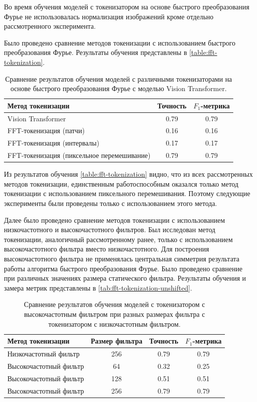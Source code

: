 Во время обучения моделей с токенизатором на основе быстрого преобразования Фурье не использовалась нормализация изображений кроме отдельно рассмотренного эксперимента.

Было проведено сравнение методов токенизации с использованием быстрого преобразования Фурье. Результаты обучения представлены в \autoref{table:fft-tokenization}.

\begin{table}[H]
  \centering
  \begin{tabular}{|l|c|c|}
    \hline
    Метод токенизации & Точность & $F_1$-метрика \\ \hline
    Vision Transformer & 0.79 & 0.79  \\
    FFT-токенизация (патчи) & 0.16 & 0.16  \\ 
    FFT-токенизация (интервалы)  & 0.17 & 0.17  \\ 
    FFT-токенизация (пиксельное перемешивание) & 0.79 & 0.79 \\
    \hline
  \end{tabular}
    \caption{Сравнение результатов обучения моделей с различными токенизаторами на основе быстрого преобразования Фурье с моделью Vision Transformer.}
  \label{table:fft-tokenization}
\end{table}

Из результатов обучения \autoref{table:fft-tokenization} видно, что из всех рассмотренных методов токенизации, единственным работоспособным оказался только метод токенизации с использованием пиксельного перемешивания. Поэтому следующие эксперименты были проведены только с использованием этого метода.

Далее было проведено сравнение методов токенизации с использованием низкочастотного и высокочастотного фильтров. Был исследован метод токенизации, аналогичный рассмотренному ранее, только с использованием высокочастотного фильтра вместо низкочастотного. Для построения высокочастотного фильтра не применялась центральная симметрия результата работы алгоритма быстрого преобразования Фурье. Было проведено сравнение при различных значениях размера статического фильтра. Результаты обучения и замера метрик представлены в \autoref{tab:fft-tokenization-unshifted}.

\begin{table}[H]
  \centering
  \begin{tabular}{|l|c|c|c|}
    \hline
    Метод токенизации & Размер фильтра & Точность & $F_1$-метрика \\ \hline
    Низкочастотный фильтр & 256 & 0.79 & 0.79 \\
    Высокочастотный фильтр & 64 & 0.32 & 0.25 \\
    Высокочастотный фильтр & 128 & 0.51 & 0.51 \\
    Высокочастотный фильтр & 256 & 0.79 & 0.79 \\
    \hline
  \end{tabular}
    \caption{Сравнение результатов обучения моделей с токенизатором с высокочастотным фильтром при разных размерах фильтра с токенизатором с низкочастотным фильтром.}
  \label{tab:fft-tokenization-unshifted}
\end{table}

